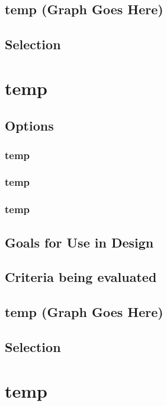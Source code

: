 \documentclass[10pt,letterpaper,onecolumn,journal]{IEEEtran}
\begin{document}
\subsection*{temp (Graph Goes Here)}

\subsection{Selection}

\section{temp}

\subsection{Options}
\subsubsection{temp}

\subsubsection{temp}

\subsubsection{temp}

\subsection{Goals for Use in Design}

\subsection{Criteria being evaluated}

\subsection*{temp (Graph Goes Here)}

\subsection{Selection}

\section{temp}
\end{document}
